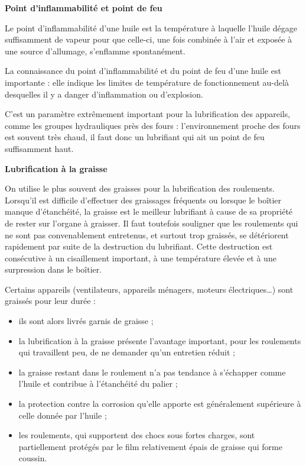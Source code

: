 \vspace{0.3cm}
\textbf{Point d’inflammabilité et point de feu}
\vspace{0.3cm}

Le point d’inflammabilité d’une huile est la température à laquelle l’huile dégage suffisamment de vapeur pour que celle-ci, une fois combinée à l’air et exposée à une source d’allumage, s’enflamme spontanément.
\vspace{0.3cm}

La connaissance du point d’inflammabilité et du point de feu d’une huile est importante : elle indique les limites de température de fonctionnement au-delà desquelles il y a danger d’inflammation ou d’explosion.
\vspace{0.3cm}

C’est un paramètre extrêmement important pour la lubrification des appareils, comme les groupes hydrauliques près des fours : l’environnement proche des fours est souvent très chaud, il faut donc un lubrifiant qui ait un point de feu suffisamment haut.

\vspace{0.3cm}
\textbf{Lubrification à la graisse}
\vspace{0.3cm} 

On utilise le plus souvent des graisses pour la lubrification des roulements. Lorsqu’il est difficile d’effectuer des graissages fréquents ou lorsque le boîtier manque d’étanchéité, la graisse est le meilleur lubrifiant à cause de sa propriété de rester sur l’organe à graisser.
Il faut toutefois souligner que les roulements qui ne sont pas convenablement entretenus, et surtout trop graissés, se détériorent rapidement par suite de la destruction du lubrifiant. Cette destruction est consécutive à un cisaillement important, à une température élevée et à une surpression dans le boîtier.
\vspace{0.3cm}

Certains appareils (ventilateurs, appareils ménagers, moteurs électriques…) sont graissés pour leur durée : 

\begin{itemize}
\item  ils sont alors livrés garnis de graisse ;
\item  la lubrification à la graisse présente l’avantage important, pour les roulements qui travaillent peu, de ne demander qu’un entretien réduit ;
\item  la graisse restant dans le roulement n’a pas tendance à s’échapper comme l’huile et contribue à l’étanchéité du palier ;
\item  la protection contre la corrosion qu’elle apporte est généralement supérieure à celle donnée par l’huile ;
\item  les roulements, qui supportent des chocs sous fortes charges, sont partiellement protégés par le film relativement épais de graisse qui forme coussin.

 \end{itemize}


